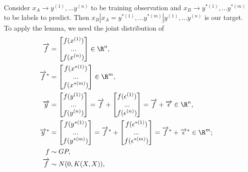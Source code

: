 Consider $x_A \rightarrow y^{(1)}, ... y^{(n)}$ to be training observation and $x_B \rightarrow y^{*(1)}, ... y^{*(m)}$ to be labels to predict. Then $x_B | x_A = y^{*(1)}, ... y^{*(m)} | y^{(1)}, ... y^{(n)}$ is our target. To apply the lemma, we need the joint distribution of
\begin{equation*} \label{eq1}
	\begin{split}
		\overrightarrow{f}& =
		\begin{bmatrix}
			f(x^{(1)})\\
			...\\
			f(x^{(n)})\\
		\end{bmatrix}
		\in \R^n, \\
		\overrightarrow{f}^* & = 
		\begin{bmatrix}
			f(x^{*(1)})\\
			...\\
			f(x^{*(m)})\\
		\end{bmatrix}
		\in \R^m,\\
		\overrightarrow{y}& =
		\begin{bmatrix}
			f(y^{(1)})\\
			...\\
			f(y^{(n)})\\
		\end{bmatrix}
		= \overrightarrow{f} + 
		\begin{bmatrix}
			f(\epsilon^{(1)})\\
			...\\
			f(\epsilon^{(n)})\\
		\end{bmatrix}
		= \overrightarrow{f} + \overrightarrow{\epsilon} \in \R^n,\\
		\overrightarrow{y}^* & = 
		\begin{bmatrix}
			f(y^{*(1)})\\
			...\\
			f(y^{*(m)})\\
		\end{bmatrix}
		= \overrightarrow{f}^* + 
		\begin{bmatrix}
			f(\epsilon^{*(1)})\\
			...\\
			f(\epsilon^{*(m)})\\
		\end{bmatrix}
		= \overrightarrow{f}^* + \overrightarrow{\epsilon}^* \in \R^m;\\
		f &\sim GP,\\
		\overrightarrow{f} &\sim N(0, K(X, X)),
	\end{split}
\end{equation*}

